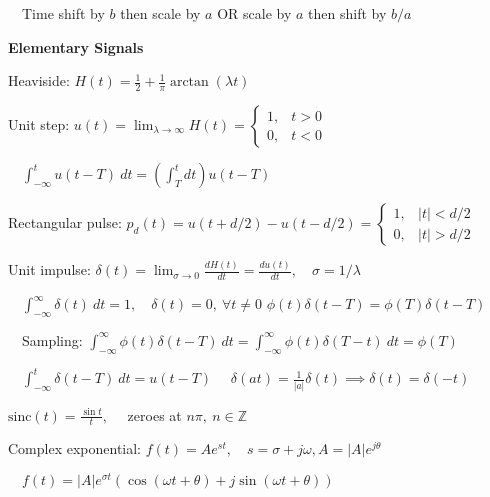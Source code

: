 \documentclass[twocolumn]{article}
\begin{document}
$\quad$Time shift by $b$ then scale by $a$ OR scale by $a$ then shift by $b/a$

\vspace{-.5em}
\dotfill

\textbf{Elementary Signals}

Heaviside: $H(t) = \frac{1}{2} + \frac{1}{\pi} \arctan(\lambda t)$

Unit step: $u(t) = \lim_{\lambda \to \infty} H(t) = \begin{cases} 1, & t > 0 \\ 0, & t < 0 \end{cases}$

$\quad \int_{-\infty}^t u(t-T)\ dt = \left( \int_T^t dt \right) u(t-T)$

Rectangular pulse: $p_d(t) = u(t+d/2) - u(t-d/2) = \begin{cases} 1, & |t| < d/2 \\ 0, & |t| > d/2 \end{cases}$

Unit impulse: $\delta(t) = \lim_{\sigma \to 0} \frac{dH(t)}{dt} = \frac{du(t)}{dt}, \quad \sigma = 1 / \lambda$

$\quad \int_{-\infty}^\infty \delta(t)\ dt = 1, \quad \delta (t) = 0,\ \forall t \neq 0$ \hfill $\phi(t) \delta(t-T) = \phi(T) \delta(t-T)$

$\quad$Sampling: $\int_{-\infty}^\infty \phi(t) \delta(t-T)\ dt = \int_{-\infty}^\infty \phi(t) \delta(T-t)\ dt = \phi(T)$


\newpage

$\quad \int_{-\infty}^t \delta(t-T)\ dt = u(t-T)$ \hfill $\quad \delta(at) = \frac{1}{|a|} \delta(t) \implies \delta(t) = \delta(-t)$

$\text{sinc}(t) = \frac{\sin t}{t}, \quad$ zeroes at $n \pi,\ n \in \mathbb{Z}$

Complex exponential: $f(t) = Ae^{st}, \quad s = \sigma + j \omega, A = |A| e^{j \theta}$

$\quad f(t) = |A|e^{\sigma t} \left( \cos(\omega t + \theta) + j \sin (\omega t + \theta) \right)$
\end{document}

